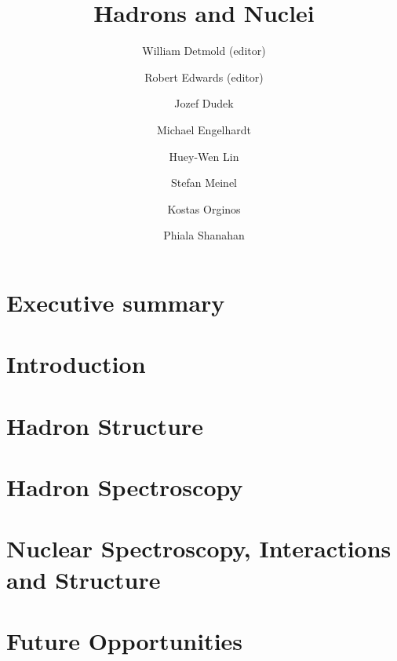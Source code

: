 \documentclass[aps,prd,nofootinbib,floatfix,superscriptaddress,preprint,tightenlines]{revtex4-1}
\begin{document}
\title{Hadrons and Nuclei}
%
\author{William Detmold (editor)}
%
\author{Robert Edwards (editor)}
%
\author{Jozef Dudek}
%
\author{Michael Engelhardt}
%
\author{Huey-Wen Lin}
%
\author{Stefan Meinel}
%
\author{Kostas Orginos}
%
\author{Phiala Shanahan}




%
    

\maketitle

\section*{Executive summary}


\newpage
\tableofcontents
\newpage 

\section{Introduction}
\label{sec:intro}


\section{Hadron Structure}
\label{sec:hadronstructure}


\section{Hadron Spectroscopy}
\label{sec:hadronspectroscopy}


\section{Nuclear Spectroscopy, Interactions and Structure}
\label{sec:nuclear}


\section{Future Opportunities}
\label{sec:future}


\begin{figure}
    \vspace*{3cm}
\end{figure}



\end{document}
